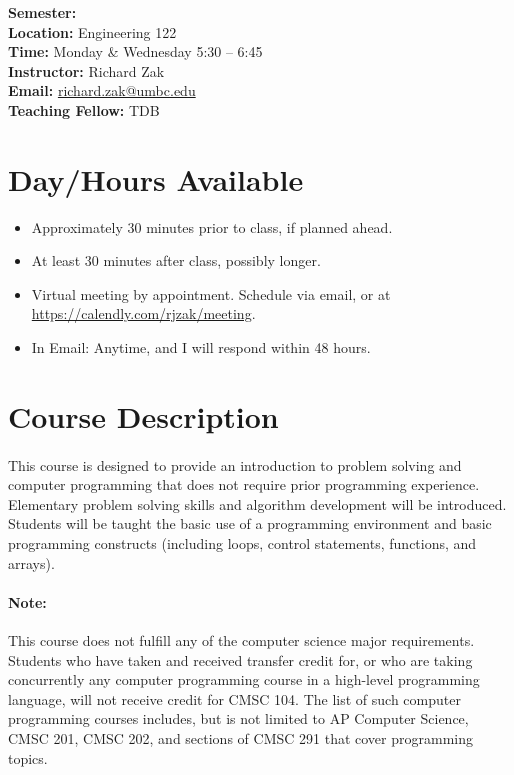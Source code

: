 \documentclass[letter,10pt]{article}
\begin{document}
\textbf{Semester:} \\
\textbf{Location:} Engineering 122 \\
\textbf{Time:} Monday \& Wednesday 5:30 -- 6:45 \\
\textbf{Instructor:} Richard Zak \\
\textbf{Email:} \href{mailto:richard.zak@umbc.edu?Subject=CMSC104}{richard.zak@umbc.edu} \\
\textbf{Teaching Fellow:} TDB %

\section*{Day/Hours Available}
\begin{itemize}
\item Approximately 30 minutes prior to class, if planned ahead.
\item At least 30 minutes after class, possibly longer.
\item Virtual meeting by appointment. Schedule via email, or at \url{https://calendly.com/rjzak/meeting}.
\item In Email: Anytime, and I will respond within 48 hours.
\end{itemize}

\section*{Course Description}
\paragraph{}This course is designed to provide an introduction to problem solving and computer programming that does not require prior programming experience. Elementary problem solving skills and algorithm development will be introduced. Students will be taught the basic use of a programming environment and basic programming constructs (including loops, control statements, functions, and arrays).

\paragraph{Note:}This course does not fulfill any of the computer science major requirements. Students who have taken and received transfer credit for, or who are taking concurrently any computer programming course in a high-level programming language, will not receive credit for CMSC 104. The list of such computer programming courses includes, but is not limited to AP Computer Science, CMSC 201, CMSC 202, and sections of CMSC 291 that cover programming topics.
\end{document}

